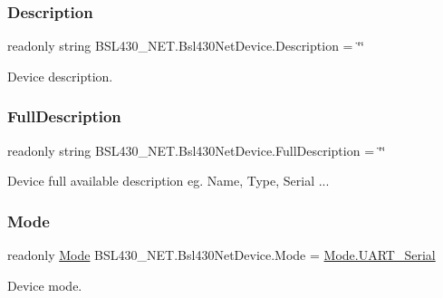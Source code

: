 \subsubsection{\texorpdfstring{Description}{Description}}
{\footnotesize\ttfamily readonly string B\+S\+L430\+\_\+\+N\+E\+T.\+Bsl430\+Net\+Device.\+Description = \char`\"{}\char`\"{}}



Device description. 

\mbox{\label{class_b_s_l430___n_e_t_1_1_bsl430_net_device_a2f438fa3df9b8df7e7d9a68fd1129f09}} 
\subsubsection{\texorpdfstring{FullDescription}{FullDescription}}
{\footnotesize\ttfamily readonly string B\+S\+L430\+\_\+\+N\+E\+T.\+Bsl430\+Net\+Device.\+Full\+Description = \char`\"{}\char`\"{}}



Device full available description eg. Name, Type, Serial ... 

\mbox{\label{class_b_s_l430___n_e_t_1_1_bsl430_net_device_a4efd86d2dbdb52db51e759a2c0ca9c30}} 
\subsubsection{\texorpdfstring{Mode}{Mode}}
{\footnotesize\ttfamily readonly \mbox{\hyperlink{namespace_b_s_l430___n_e_t_aa1c6981cb6f279b5491d861ca555a1d7}{Mode}} B\+S\+L430\+\_\+\+N\+E\+T.\+Bsl430\+Net\+Device.\+Mode = \mbox{\hyperlink{namespace_b_s_l430___n_e_t_aa1c6981cb6f279b5491d861ca555a1d7a766287f492a16ccdf7b4b2a8a5ba125b}{Mode.\+U\+A\+R\+T\+\_\+\+Serial}}}



Device mode. 

\mbox{\label{class_b_s_l430___n_e_t_1_1_bsl430_net_device_aca2c9b709a7da017f45b5de85aa4f0fa}} 
